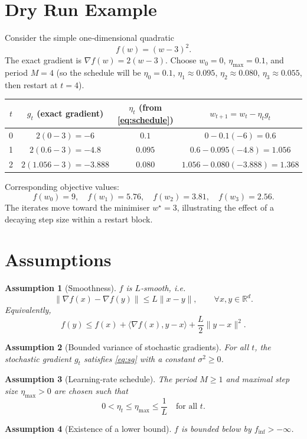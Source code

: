 \documentclass{article}
\newtheorem{assumption}{Assumption}
\begin{document}
\section*{Dry Run Example}
Consider the simple one‑dimensional quadratic
\[
f(w) = (w-3)^2 .
\]
The exact gradient is $\nabla f(w)=2(w-3)$.  
Choose $w_0=0$, $\eta_{\max}=0.1$, and period $M=4$ (so the schedule will be $\eta_0=0.1$, $\eta_1\approx0.095$, $\eta_2\approx0.080$, $\eta_3\approx0.055$, then restart at $t=4$).

\begin{center}
\begin{tabular}{c|c|c|c}
$t$ & $g_t$ (exact gradient) & $\eta_t$ (from \eqref{eq:schedule}) & $w_{t+1}=w_t-\eta_t g_t$ \\ \hline
0 & $2(0-3)=-6$ & $0.1$ & $0-0.1(-6)=0.6$ \\
1 & $2(0.6-3)=-4.8$ & $0.095$ & $0.6-0.095(-4.8)=1.056$ \\
2 & $2(1.056-3)=-3.888$ & $0.080$ & $1.056-0.080(-3.888)=1.368$ \\
\end{tabular}
\end{center}
Corresponding objective values:
\[
f(w_0)=9,\quad f(w_1)=5.76,\quad f(w_2)=3.81,\quad f(w_3)=2.56.
\]
The iterates move toward the minimiser $w^\star=3$, illustrating the effect of a decaying step size within a restart block.

\newpage

\section*{Assumptions}
\begin{assumption}[Smoothness]\label{as:smooth}
$f$ is $L$‑smooth, i.e.
\[
\|\nabla f(x)-\nabla f(y)\|\le L\|x-y\|,\qquad\forall x,y\in\mathbb{R}^d .
\]
Equivalently,
\[
f(y)\le f(x)+\langle\nabla f(x),y-x\rangle+\frac{L}{2}\|y-x\|^2 .
\]
\end{assumption}
\begin{assumption}[Bounded variance of stochastic gradients]\label{as:variance}
For all $t$, the stochastic gradient $g_t$ satisfies \eqref{eq:sg} with a constant $\sigma^2\ge0$.
\end{assumption}
\begin{assumption}[Learning‑rate schedule]\label{as:schedule}
The period $M\ge 1$ and maximal step size $\eta_{\max}>0$ are chosen such that
\[
0<\eta_t\le \eta_{\max}\le \frac{1}{L}\quad\text{for all }t .
\]
\end{assumption}
\begin{assumption}[Existence of a lower bound]\label{as:lower}
$f$ is bounded below by $f_{\inf}>-\infty$.
\end{assumption}
\end{document}
